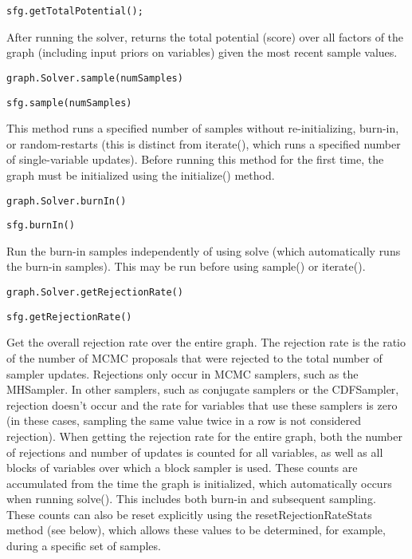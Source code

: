 \ifjava
\begin{lstlisting}
sfg.getTotalPotential();
\end{lstlisting}
\fi

After running the solver, returns the total potential (score) over all factors of the graph (including input priors on variables) given the most recent sample values.

\ifmatlab
\begin{lstlisting}
graph.Solver.sample(numSamples)
\end{lstlisting}
\fi

\ifjava
\begin{lstlisting}
sfg.sample(numSamples)
\end{lstlisting}
\fi

This method runs a specified number of samples without re-initializing, burn-in, or random-restarts (this is distinct from iterate(), which runs a specified number of single-variable updates).  Before running this method for the first time, the graph must be initialized using the initialize() method.

\ifmatlab
\begin{lstlisting}
graph.Solver.burnIn()
\end{lstlisting}
\fi

\ifjava
\begin{lstlisting}
sfg.burnIn()
\end{lstlisting}
\fi

Run the burn-in samples independently of using solve (which automatically runs the burn-in samples).  This may be run before using sample() or iterate().

\ifmatlab
\begin{lstlisting}
graph.Solver.getRejectionRate()
\end{lstlisting}
\fi

\ifjava
\begin{lstlisting}
sfg.getRejectionRate()
\end{lstlisting}
\fi

Get the overall rejection rate over the entire graph.  The rejection rate is the ratio of the number of MCMC proposals that were rejected to the total number of sampler updates.  Rejections only occur in MCMC samplers, such as the MHSampler.  In other samplers, such as conjugate samplers or the CDFSampler, rejection doesn't occur and the rate for variables that use these samplers is zero (in these cases, sampling the same value twice in a row is not considered rejection).  When getting the rejection rate for the entire graph, both the number of rejections and number of updates is counted for all variables, as well as all blocks of variables over which a block sampler is used.  These counts are accumulated from the time the graph is initialized, which automatically occurs when running solve().  This includes both burn-in and subsequent sampling.  These counts can also be reset explicitly using the resetRejectionRateStats method (see below), which allows these values to be determined, for example, during a specific set of samples.

